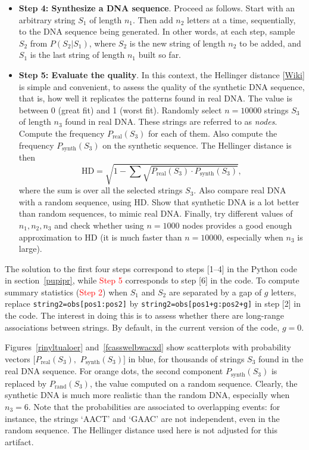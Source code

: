 \documentclass[oneside,10pt]{book}
\begin{document}
\begin{itemize}
\vspace{1ex}
\item[] {\bf Step 4: Synthesize a DNA sequence}. Proceed as follows. 
Start with an arbitrary string $S_1$ of length $n_1$. Then add $n_2$ letters at a time, sequentially, to the DNA sequence being generated. In other words, at each step, sample $S_2$ from
 $P(S_2 | S_1)$, where $S_2$ is the new string of length $n_2$ to be added, and $S_1$ is the last string of length $n_1$ built so far.
\vspace{1ex}
\item[] {\bf Step 5: Evaluate the quality}. In this context, the \textcolor{index}{Hellinger distance} 
 [\href{https://en.wikipedia.org/wiki/Hellinger_distance}{Wiki}] is simple and convenient, to assess the quality of
 the synthetic DNA sequence, that is, how well it replicates the patterns found in real DNA. The value is between 0 (great fit) and 1 (worst fit).
 Randomly select $n = \num{10000}$ strings $S_3$ of length $n_3$ found in real DNA. These strings are referred to as 
{\em nodes}.  Compute the frequency $P_\text{real}(S_3)$ for each of them. 
 Also compute the frequency $P_\text{synth}(S_3)$ on the synthetic sequence. The Hellinger distance is then
$$
\text{HD} = \sqrt{1 - \sum \sqrt{P_\text{real}(S_3)\cdot P_\text{synth}(S_3)}},
$$
where the sum is over all the selected strings $S_3$. Also compare real DNA with a random sequence,
 using HD. Show that synthetic DNA is a lot better than random sequences, to mimic real DNA. Finally, try different values of $n_1, n_2, n_3$
 and check whether using $n=1000$ nodes provides a good enough approximation to HD (it is much faster than $n=\num{10000}$, especially
 when $n_3$ is large).
\end{itemize}
\vspace{1ex}


\noindent The solution to the first four steps correspond to steps [1--4] in the Python code in section~\ref{pupipr}, while
 \textcolor{red}{Step 5} corresponds to step [6] in the code. To compute summary statistics (\textcolor{red}{Step 2}) when $S_1$ and $S_2$ are separated by a gap of $g$ letters, replace \texttt{string2=obs[pos1:pos2]}
 by \texttt{string2=obs[pos1+g:pos2+g]} in step [2] in the code. The interest in doing this is to assess whether there are
 long-range associations between strings. By default, in the current version of the code, $g=0$. 

Figures~\ref{rinyltualoer} and~\ref{fcasswelbwacxd} show scatterplots with probability vectors 
$[P_\text{real}(S_3),$ $P_\text{synth}(S_3)]$ in blue, 
 for thousands of strings $S_3$ found in the real DNA sequence. 
 For orange dots, the second component $P_\text{synth}(S_3)$ is replaced by $P_\text{rand}(S_3)$, the value computed on a random sequence.
 Clearly, the synthetic DNA is much more realistic than the random DNA, especially when $n_3 = 6$. Note that 
 the probabilities are associated to overlapping events: for instance, the strings `AACT' and `GAAC' are not independent, even in the random sequence. The Hellinger distance used here is not adjusted for this artifact. 
\end{document}
